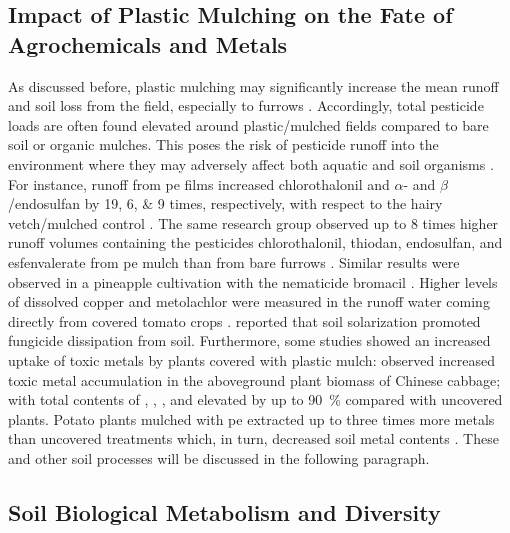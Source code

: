 \subsection{Impact of Plastic Mulching on the Fate of Agrochemicals and Metals}

As discussed before, plastic mulching may significantly increase the mean runoff and soil loss from the field, especially to furrows \citep{WanRunoff1999,ZhangInfluences2014,ZhangDistribution2015}. Accordingly, total pesticide loads are often found elevated around plastic\-/mulched fields compared to bare soil or organic mulches. This poses the risk of pesticide runoff into the environment where they may adversely affect both aquatic and soil organisms \citep{ArnoldRunoff2004,DietrichFate2014}. For instance, runoff from \ac{pe} films increased chlorothalonil and $\alpha$- and $\beta$\-/endosulfan by \numlist{19;6;9} times, respectively, with respect to the hairy vetch\-/mulched control \citep{RiceRunoff2001}. The same research group observed up to \num{8} times higher runoff volumes containing the pesticides chlorothalonil, thiodan, endosulfan, and esfenvalerate from \ac{pe} mulch than from bare furrows \citep{RiceEvaluation2007}. Similar results were observed in a pineapple cultivation with the nematicide bromacil \citep{AlaviEvaluation2007}. Higher levels of dissolved copper and metolachlor were measured in the runoff water coming directly from covered tomato crops \citep{ArnoldRunoff2004,RiceComparison2002}.  reported that soil solarization promoted fungicide dissipation from soil. Furthermore, some studies showed an increased uptake of toxic metals by plants covered with plastic mulch: \citet{MorenoAccumulation2002} observed increased toxic metal accumulation in the aboveground plant biomass of Chinese cabbage; with total contents of , , , and  elevated by up to \SI{90}{\percent} compared with uncovered plants. Potato plants mulched with \ac{pe} extracted up to three times more metals than uncovered treatments which, in turn, decreased soil metal contents \citep{BaghourInfluence2001,BaghourInfluence2002}. These and other soil processes will be discussed in the following paragraph.

\subsection{Soil Biological Metabolism and Diversity}

